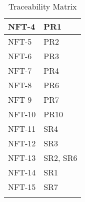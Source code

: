 \documentclass[12pt, titlepage]{article}
\begin{document}
\begin{longtable}{| p{} | p{} |}
    \hline
    NFT-4 & PR1\\
    \hline
    NFT-5 & PR2\\
    \hline
    NFT-6 & PR3\\
    \hline
    NFT-7 & PR4\\
    \hline
    NFT-8 & PR6\\
    \hline
    NFT-9 & PR7\\
    \hline
    NFT-10 & PR10\\
    \hline
    NFT-11 & SR4\\
    \hline
    NFT-12 & SR3\\
    \hline
    NFT-13 & SR2, SR6\\
    \hline
    NFT-14 & SR1\\
    \hline
    NFT-15 & SR7\\
    \hline
\caption{Traceability Matrix}
\end{longtable}







\end{document}
